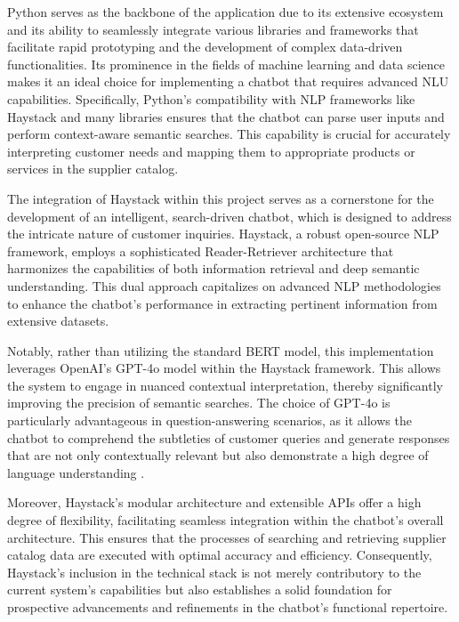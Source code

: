 Python serves as the backbone of the application due to its extensive ecosystem and its ability to seamlessly integrate
various libraries and frameworks that facilitate rapid prototyping and the development of complex data-driven
functionalities.\autocite[cf.][p. 12]{shrivastavaDesignImplementationChatbot}
\autocite[cf.][pp. 240--241]{christensenPythonPipelineRapid2022} Its prominence in the fields of machine
learning and data science makes it an ideal choice for implementing a chatbot that requires advanced \ac{NLU}
capabilities.\autocite[cf.][p. 1]{lortiePythonModernData2022}\autocite[cf.][p. 85]{joshiOverviewPythonLibraries}
Specifically, Python's compatibility with \acs{NLP} frameworks like Haystack and many libraries ensures that
the chatbot can parse user inputs and perform context-aware semantic searches.
\autocite[cf.][p. 21]{fareezPOPULARPYTHONLIBRARIES2020} This capability is crucial for accurately interpreting customer
needs and mapping them to appropriate products or services in the supplier catalog.

The integration of Haystack within this project serves as a cornerstone for the development of an intelligent,
search-driven chatbot, which is designed to address the intricate nature of customer inquiries. Haystack, a robust
open-source \acs{NLP} framework, employs a sophisticated Reader-Retriever architecture that
harmonizes the capabilities of both information retrieval and deep semantic understanding. This dual approach
capitalizes on advanced \acs{NLP} methodologies to enhance the chatbot’s performance in extracting pertinent information
from extensive datasets\autocite[cf.][p. 236]{krishnamoorthyEvolutionReadingComprehension2021}.

Notably, rather than utilizing the standard BERT model, this implementation leverages OpenAI’s GPT-4o model within the
Haystack framework. This allows the system to engage in nuanced contextual interpretation, thereby significantly
improving the precision of semantic searches. The choice of GPT-4o is particularly advantageous in question-answering
scenarios, as it allows the chatbot to comprehend the subtleties of customer queries and generate responses that are not
only contextually relevant but also demonstrate a high degree of language understanding
\autocite[cf.][pp. 943--944]{syedQuestionAnsweringChatbot2021}.

Moreover, Haystack’s modular architecture and extensible \acp{API} offer a high degree of flexibility, facilitating
seamless integration within the chatbot’s overall architecture. This ensures that the processes of searching and
retrieving supplier catalog data are executed with optimal accuracy and efficiency. Consequently, Haystack’s inclusion
in the technical stack is not merely contributory to the current system’s capabilities but also establishes a solid
foundation for prospective advancements and refinements in the chatbot’s functional repertoire.


